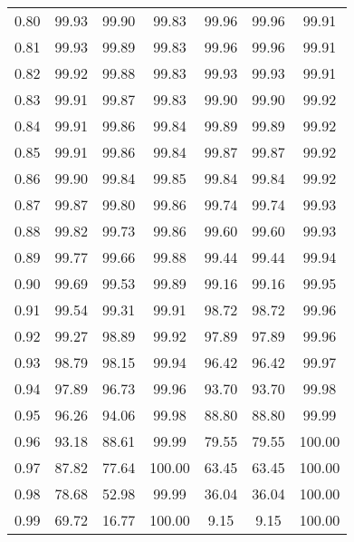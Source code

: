 \begin{tabular}{|c|c|c|c|c|c|c|}
      0.80 &     99.93 &     99.90 &      99.83 &   99.96 &      99.96 &         99.91 \\
      0.81 &     99.93 &     99.89 &      99.83 &   99.96 &      99.96 &         99.91 \\
      0.82 &     99.92 &     99.88 &      99.83 &   99.93 &      99.93 &         99.91 \\
      0.83 &     99.91 &     99.87 &      99.83 &   99.90 &      99.90 &         99.92 \\
      0.84 &     99.91 &     99.86 &      99.84 &   99.89 &      99.89 &         99.92 \\
      0.85 &     99.91 &     99.86 &      99.84 &   99.87 &      99.87 &         99.92 \\
      0.86 &     99.90 &     99.84 &      99.85 &   99.84 &      99.84 &         99.92 \\
      0.87 &     99.87 &     99.80 &      99.86 &   99.74 &      99.74 &         99.93 \\
      0.88 &     99.82 &     99.73 &      99.86 &   99.60 &      99.60 &         99.93 \\
      0.89 &     99.77 &     99.66 &      99.88 &   99.44 &      99.44 &         99.94 \\
      0.90 &     99.69 &     99.53 &      99.89 &   99.16 &      99.16 &         99.95 \\
      0.91 &     99.54 &     99.31 &      99.91 &   98.72 &      98.72 &         99.96 \\
      0.92 &     99.27 &     98.89 &      99.92 &   97.89 &      97.89 &         99.96 \\
      0.93 &     98.79 &     98.15 &      99.94 &   96.42 &      96.42 &         99.97 \\
      0.94 &     97.89 &     96.73 &      99.96 &   93.70 &      93.70 &         99.98 \\
      0.95 &     96.26 &     94.06 &      99.98 &   88.80 &      88.80 &         99.99 \\
      0.96 &     93.18 &     88.61 &      99.99 &   79.55 &      79.55 &        100.00 \\
      0.97 &     87.82 &     77.64 &     100.00 &   63.45 &      63.45 &        100.00 \\
      0.98 &     78.68 &     52.98 &      99.99 &   36.04 &      36.04 &        100.00 \\
      0.99 &     69.72 &     16.77 &     100.00 &    9.15 &       9.15 &        100.00 \\
\bottomrule
\end{tabular}
